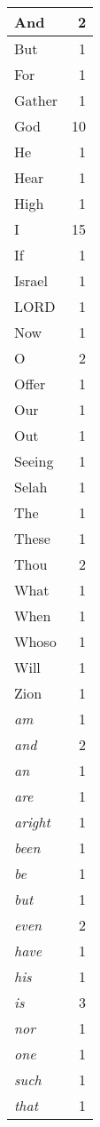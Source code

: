 \begin{center}
\begin{longtable}{l|r}
\hline \hline
\endlastfoot
And & 2 \\ \hline
But & 1 \\ \hline
For & 1 \\ \hline
Gather & 1 \\ \hline
God & 10 \\ \hline
He & 1 \\ \hline
Hear & 1 \\ \hline
High & 1 \\ \hline
I & 15 \\ \hline
If & 1 \\ \hline
Israel & 1 \\ \hline
LORD & 1 \\ \hline
Now & 1 \\ \hline
O & 2 \\ \hline
Offer & 1 \\ \hline
Our & 1 \\ \hline
Out & 1 \\ \hline
Seeing & 1 \\ \hline
Selah & 1 \\ \hline
The & 1 \\ \hline
These & 1 \\ \hline
Thou & 2 \\ \hline
What & 1 \\ \hline
When & 1 \\ \hline
Whoso & 1 \\ \hline
Will & 1 \\ \hline
Zion & 1 \\ \hline
\emph{am} & 1 \\ \hline
\emph{and} & 2 \\ \hline
\emph{an} & 1 \\ \hline
\emph{are} & 1 \\ \hline
\emph{aright} & 1 \\ \hline
\emph{been} & 1 \\ \hline
\emph{be} & 1 \\ \hline
\emph{but} & 1 \\ \hline
\emph{even} & 2 \\ \hline
\emph{have} & 1 \\ \hline
\emph{his} & 1 \\ \hline
\emph{is} & 3 \\ \hline
\emph{nor} & 1 \\ \hline
\emph{one} & 1 \\ \hline
\emph{such} & 1 \\ \hline
\emph{that} & 1 \\ \hline

\end{longtable}
\end{center}

